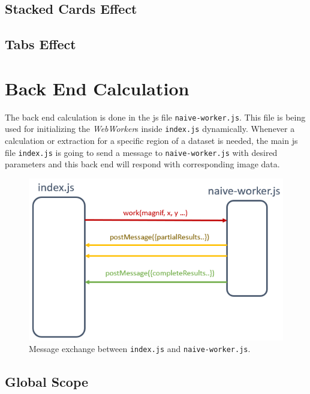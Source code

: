 \subsection{Stacked Cards Effect}

\subsection{Tabs Effect}


\section{Back End Calculation}

The back end calculation is done in the \gls{js} file \texttt{naive-worker.js}. This file is being used for initializing the \emph{WebWorker}s inside \texttt{index.js} dynamically. Whenever a calculation or extraction for a specific region of a dataset is needed, the main \gls{js} file \texttt{index.js} is going to send a message to \texttt{naive-worker.js} with desired parameters and this back end will respond with corresponding image data.

\begin{figure}[th]
\centering
\includegraphics[keepaspectratio]{Figures/Chapter4/messageexchange.png}
\decoRule
\caption[Message Exchange]{Message exchange between \texttt{index.js} and \texttt{naive-worker.js}.}
\label{fig:messageexchange}
\end{figure}

\subsection{Global Scope}

